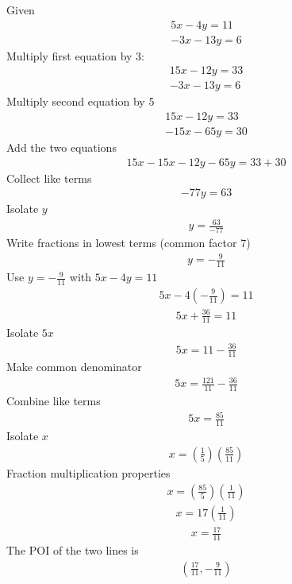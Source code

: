\begin{questions}
\begin{solution}
Given
\begin{gather*}
5x-4y=11\\
-3x-13y=6
\end{gather*}
Multiply first equation by 3:
\begin{gather*}
15x-12y=33\\
-3x-13y=6
\end{gather*}
Multiply second equation by 5
\begin{gather*}
15x-12y=33\\
-15x-65y=30
\end{gather*}
Add the two equations
\begin{gather*}
15x-15x-12y-65y=33+30
\end{gather*}
Collect like terms
\begin{gather*}
-77y=63
\end{gather*}
Isolate $y$
\begin{gather*}
y=\frac{63}{-77}
\end{gather*}
Write fractions in lowest terms (common factor $7$)
\begin{gather*}
y=-\frac{9}{11}
\end{gather*}
Use $y=-\frac{9}{11}$ with $5x-4y=11$
\begin{gather*}
5x-4\left(-\frac{9}{11}\right)=11
\end{gather*}
\begin{gather*}
5x+\frac{36}{11}=11
\end{gather*}
Isolate $5x$
\begin{gather*}
5x=11-\frac{36}{11}
\end{gather*}
Make common denominator
\begin{gather*}
5x=\frac{121}{11}-\frac{36}{11}
\end{gather*}
Combine like terms
\begin{gather*}
5x=\frac{85}{11}
\end{gather*}
Isolate $x$
\begin{gather*}
x=\left(\frac{1}{5}\right) \left(\frac{85}{11}\right)
\end{gather*}
Fraction multiplication properties
\begin{gather*}
x=\left(\frac{85}{5}\right) \left(\frac{1}{11}\right)
\end{gather*}
\begin{gather*}
x=17 \left(\frac{1}{11}\right)
\end{gather*}
\begin{gather*}
x=\frac{17}{11}
\end{gather*}
The POI of the two lines is
\begin{gather*}
\left(\frac{17}{11}, -\frac{9}{11}\right)
\end{gather*}
\end{solution}
\end{questions}

